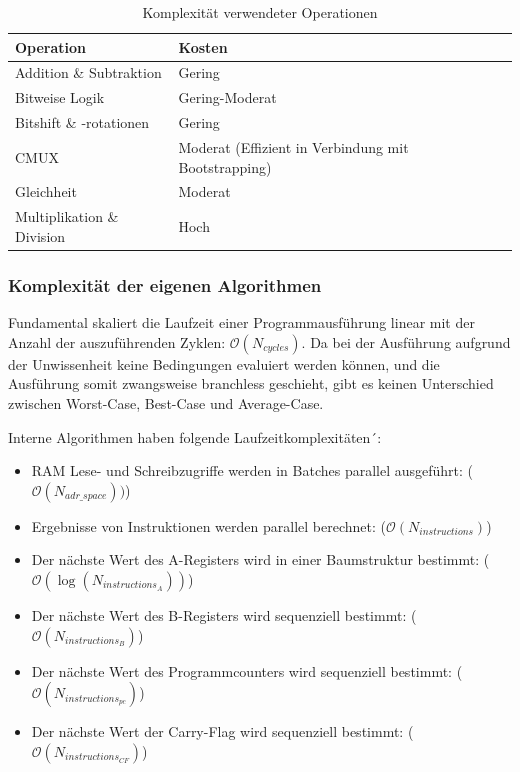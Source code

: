 \begin{table}[htbp]
    \centering
    \caption{Komplexität verwendeter Operationen}
    \label{tab:tfhe_cost}
    \begin{tabular}{llll}
        \toprule
        \textbf{Operation}         & \textbf{Kosten}                                     \\
        \midrule
        Addition \& Subtraktion    & Gering                                              \\
        Bitweise Logik             & Gering-Moderat                                      \\
        Bitshift \& -rotationen    & Gering                                              \\
        CMUX                       & Moderat (Effizient in Verbindung mit Bootstrapping) \\
        Gleichheit                 & Moderat                                             \\
        Multiplikation \& Division & Hoch                                                \\
        \bottomrule
    \end{tabular}
\end{table}

\subsubsection{Komplexität der eigenen Algorithmen}
Fundamental skaliert die Laufzeit einer Programmausführung linear mit der Anzahl der auszuführenden Zyklen:
$\mathcal{O}(N_{cycles})$.
Da bei der Ausführung aufgrund der Unwissenheit keine Bedingungen evaluiert werden können,
und die Ausführung somit zwangsweise branchless geschieht,
gibt es keinen Unterschied zwischen Worst-Case, Best-Case und Average-Case.

Interne Algorithmen haben folgende Laufzeitkomplexitäten´:
\begin{itemize}
    \item RAM Lese- und Schreibzugriffe werden in Batches parallel ausgeführt: ($\mathcal{O}(N_{adr\_space}))$)
    \item Ergebnisse von Instruktionen werden parallel berechnet: ($\mathcal{O}(N_{instructions})$)
    \item Der nächste Wert des A-Registers wird in einer Baumstruktur bestimmt: ($\mathcal{O}(\log(N_{instructions_A}))$)
    \item Der nächste Wert des B-Registers wird sequenziell bestimmt: ($\mathcal{O}(N_{instructions_{B}})$)
    \item Der nächste Wert des Programmcounters wird sequenziell bestimmt: ($\mathcal{O}(N_{instructions_{pc}})$)
    \item Der nächste Wert der Carry-Flag wird sequenziell bestimmt: ($\mathcal{O}(N_{instructions_{CF}})$)
\end{itemize}


